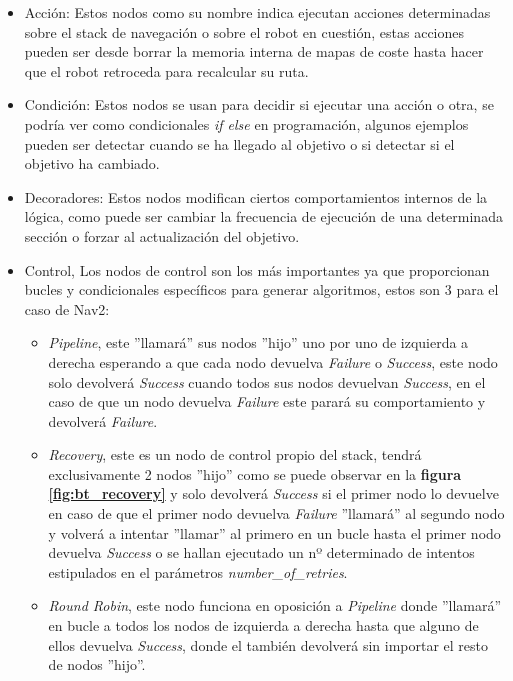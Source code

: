 \begin{itemize}
    \item Acción: Estos nodos como su nombre indica ejecutan acciones determinadas sobre el stack de navegación o sobre el robot en cuestión, estas acciones pueden ser desde borrar la memoria interna de mapas de coste hasta hacer que el robot retroceda para recalcular su ruta.
    \item Condición: Estos nodos se usan para decidir si ejecutar una acción o otra, se podría ver como condicionales \textit{if{} else{}} en programación, algunos ejemplos pueden ser detectar cuando se ha llegado al objetivo o si detectar si el objetivo ha cambiado.
    \item Decoradores: Estos nodos modifican ciertos comportamientos internos de la lógica, como puede ser cambiar la frecuencia de ejecución de una determinada sección o forzar al actualización del objetivo.
    \item Control, Los nodos de control son los más importantes ya que proporcionan bucles y condicionales específicos para generar algoritmos, estos son 3 para el caso de Nav2:
    \begin{itemize}
        \item \textit{Pipeline}, este ''llamará'' sus nodos ''hijo'' uno por uno de izquierda a derecha esperando a que cada nodo devuelva \textit{Failure} o \textit{Success}, este nodo solo devolverá \textit{Success} cuando todos sus nodos devuelvan \textit{Success}, en el caso de que un nodo devuelva \textit{Failure} este parará su comportamiento y devolverá \textit{Failure}.
        \item \textit{Recovery}, este es un nodo de control propio del stack, tendrá exclusivamente 2 nodos ''hijo'' como se puede observar en la \textbf{figura \ref{fig:bt_recovery}} y solo devolverá \textit{Success} si el primer nodo lo devuelve en caso de que el primer nodo devuelva \textit{Failure} ''llamará'' al segundo nodo y volverá a intentar ''llamar'' al primero en un bucle hasta el primer nodo devuelva \textit{Success} o se hallan ejecutado un nº determinado de intentos estipulados en el parámetros \textit{number\_of\_retries}.
        \item \textit{Round Robin}, este nodo funciona en oposición a \textit{Pipeline} donde ''llamará'' en bucle a todos los nodos de izquierda a derecha hasta que alguno de ellos devuelva \textit{Success}, donde el también devolverá  sin importar el resto de nodos ''hijo''.
    \end{itemize}
\end{itemize}

